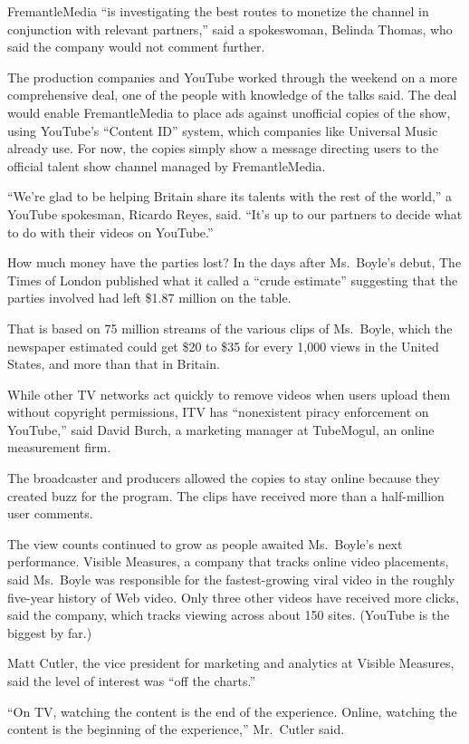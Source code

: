 \documentclass[12pt,a4paper,onecolumn]{article}
\begin{document}
FremantleMedia ``is investigating the best routes to monetize the channel in conjunction with
relevant partners,'' said a spokeswoman, Belinda Thomas, who said the company would not comment
further.

The production companies and YouTube worked through the weekend on a more comprehensive deal, one of
the people with knowledge of the talks said. The deal would enable FremantleMedia to place ads
against unofficial copies of the show, using YouTube's ``Content ID'' system, which companies like
Universal Music already use. For now, the copies simply show a message directing users to the
official talent show channel managed by FremantleMedia.

``We're glad to be helping Britain share its talents with the rest of the world,'' a YouTube
spokesman, Ricardo Reyes, said. ``It's up to our partners to decide what to do with their videos on
YouTube.''

How much money have the parties lost? In the days after Ms.~Boyle's debut, The Times of London
published what it called a ``crude estimate'' suggesting that the parties involved had left \$1.87
million on the table.

That is based on 75 million streams of the various clips of Ms.~Boyle, which the newspaper estimated
could get \$20 to \$35 for every 1,000 views in the United States, and more than that in Britain.

While other TV networks act quickly to remove videos when users upload them without copyright
permissions, ITV has ``nonexistent piracy enforcement on YouTube,'' said David Burch, a marketing
manager at TubeMogul, an online measurement firm.

The broadcaster and producers allowed the copies to stay online because they created buzz for the
program. The clips have received more than a half-million user comments.

The view counts continued to grow as people awaited Ms.~Boyle's next performance. Visible Measures,
a company that tracks online video placements, said Ms.~Boyle was responsible for the
fastest-growing viral video in the roughly five-year history of Web video. Only three other videos
have received more clicks, said the company, which tracks viewing across about 150 sites. (YouTube
is the biggest by far.)

Matt Cutler, the vice president for marketing and analytics at Visible Measures, said the level of
interest was ``off the charts.''

``On TV, watching the content is the end of the experience. Online, watching the content is the
beginning of the experience,'' Mr.~Cutler said.
\end{document}
